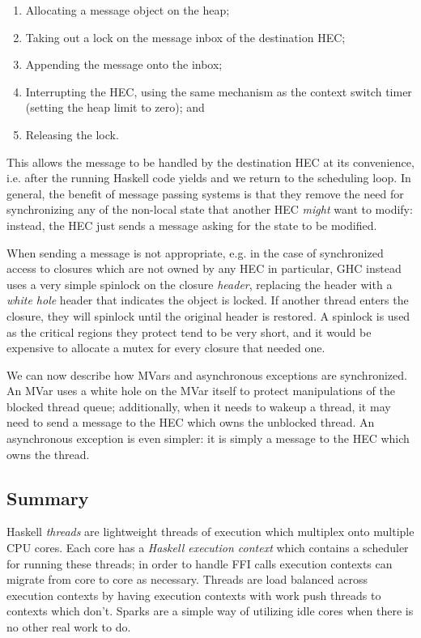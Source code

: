 \begin{enumerate}
    \item Allocating a message object on the heap;
    \item Taking out a lock on the message inbox of the destination HEC;
    \item Appending the message onto the inbox;
    \item Interrupting the HEC, using the same mechanism as the context switch timer (setting the heap limit to zero); and
    \item Releasing the lock.
\end{enumerate}

This allows the message to be handled by the destination HEC at
its convenience, i.e. after the running Haskell code yields and we
return to the scheduling loop.  In general, the benefit of message
passing systems is that they remove the need for synchronizing any of
the non-local state that another HEC \emph{might} want to modify: instead,
the HEC just sends a message asking for the state to be modified.

When sending a message is not appropriate, e.g. in the case of
synchronized access to closures which are not owned by any HEC in
particular, GHC instead uses a very simple spinlock on the closure
\emph{header}, replacing the header with a \emph{white hole} header that
indicates the object is locked.  If another thread enters the closure,
they will spinlock until the original header is restored.  A spinlock is
used as the critical regions they protect tend to be very short, and it would
be expensive to allocate a mutex for every closure that needed one.

We can now describe how MVars and asynchronous exceptions are
synchronized.  An MVar uses a white hole on the MVar itself to protect
manipulations of the blocked thread queue; additionally, when it needs
to wakeup a thread, it may need to send a message to the HEC
which owns the unblocked thread.  An asynchronous exception is even
simpler: it is simply a message to the HEC which owns the thread.

\subsection{Summary}

Haskell \emph{threads} are lightweight threads of execution which
multiplex onto multiple CPU cores.  Each core has a \emph{Haskell
execution context} which contains a scheduler for running these threads;
in order to handle FFI calls execution contexts can migrate from core to
core as necessary.  Threads are load balanced across execution contexts
by having execution contexts with work push threads to contexts which
don't.  Sparks are a simple way of utilizing idle cores when there is no
other real work to do.

